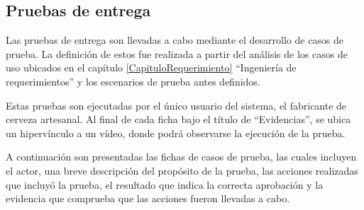 \subsection{Pruebas de entrega}

\par Las pruebas de entrega son llevadas a cabo mediante el desarrollo de casos de prueba. La definición de estos fue realizada a partir del análisis de los casos de uso ubicados en el capítulo \ref{CapituloRequerimiento} ``Ingeniería de requerimientos'' y los escenarios de prueba antes definidos.

\par Estas pruebas son ejecutadas por el único usuario del sistema, el fabricante de cerveza artesanal. Al final de cada ficha bajo el título de ``Evidencias'', se ubica un hipervínculo a un vídeo, donde podrá observarse la ejecución de la prueba.

\par A continuación son presentadas las fichas de casos de prueba, las cuales incluyen el actor, una breve descripción del propósito de la prueba, las acciones realizadas que incluyó la prueba, el resultado que indica la correcta aprobación y la evidencia que comprueba que las acciones fueron llevadas a cabo.


